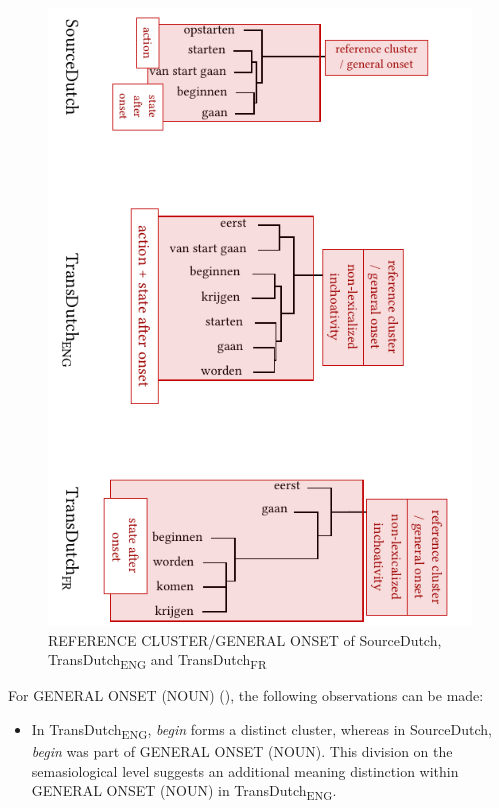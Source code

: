 \begin{figure}
\includegraphics[width=\textwidth]{figures/tree87.pdf}
\caption{\label{fig:4:84}REFERENCE CLUSTER/GENERAL ONSET of SourceDutch, TransDutch\textsubscript{ENG} and TransDutch\textsubscript{FR}}
\end{figure}

For GENERAL ONSET (NOUN) (), the following observations can be made:

\begin{itemize}
\item  In TransDutch\textsubscript{ENG}, \textit{begin} forms a distinct cluster, whereas in SourceDutch, \textit{begin} was part of GENERAL ONSET (NOUN). This division on the semasiological level suggests an additional meaning distinction within GENERAL ONSET (NOUN) in TransDutch\textsubscript{ENG}.
\end{itemize}

